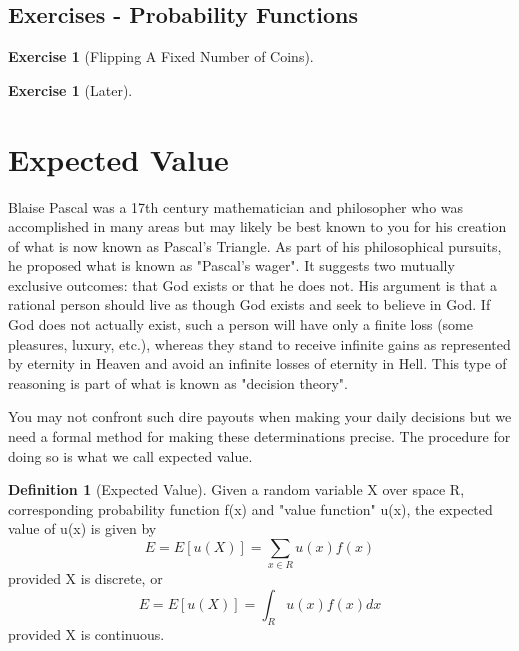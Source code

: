 \documentclass[10pt,]{book}
\theoremstyle{plain}
\theoremstyle{definition}
\newtheorem{definition}[theorem]{Definition}
\theoremstyle{definition}
\theoremstyle{definition}
\newtheorem{exercise}[theorem]{Exercise}
\numberwithin{equation}{section}
\begin{document}
\subsection[{Exercises - Probability Functions}]{Exercises - Probability Functions}\label{subsection-7}
\begin{exercise}[{Flipping A Fixed Number of Coins}]\label{exercise-44}
\end{exercise}
\begin{exercise}[{Later}]\label{exercise-45}
\end{exercise}
\typeout{************************************************}
\typeout{************************************************}
\section[{Expected Value}]{Expected Value}\label{section-28}
Blaise Pascal was a 	17th century mathematician and philosopher who was accomplished in many areas but may likely be best known to you for his creation of what is now known as Pascal's Triangle. As part of his philosophical pursuits, he proposed what is known as "Pascal's wager". It suggests two  mutually exclusive outcomes: that God exists or that he does not. His argument is that a rational person should live as though God exists and seek to believe in God. If God does not actually exist, such a person will have only a finite loss (some pleasures, luxury, etc.), whereas they stand to receive infinite gains as represented by eternity in Heaven and avoid an infinite losses of eternity in Hell. This type of reasoning is part of what is known as "decision theory".
\par
You may not confront such dire payouts when making your daily decisions but we need a formal method for making these determinations precise. The procedure for doing so is what we call expected value.
\begin{definition}[{Expected Value}]\label{definition-29}
Given a random variable X over space R, corresponding probability function f(x) and "value function" u(x), the expected value of u(x) is given by
	\begin{equation*}E = E[u(X)] = \sum_{x \in R} u(x) f(x)\end{equation*}
	provided X is discrete, or
	\begin{equation*}E = E[u(X)] = \int_R u(x)f(x) dx\end{equation*}
	provided X is continuous.
\end{definition}
\end{document}
